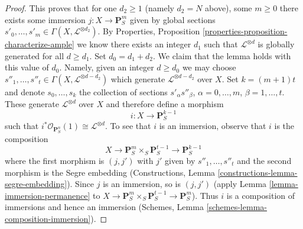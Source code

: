 \documentclass[10pt,a4paper]{amsart}
\theoremstyle{plain}
\theoremstyle{definition}
\theoremstyle{remark}
\numberwithin{equation}{subsection}
\begin{document}
\begin{proof}
\medskip\noindent
This proves that for one $d_2 \geq 1$
(namely $d_2 = N$ above), some $m \geq 0$ there exists some
immersion $j : X \to \mathbf{P}^m_S$ given by global sections
$s'_0, \ldots, s'_m \in \Gamma(X, \mathcal{L}^{\otimes d_2})$.
By Properties, Proposition \ref{properties-proposition-characterize-ample}
we know there exists an integer
$d_1$ such that $\mathcal{L}^{\otimes d}$ is globally generated
for all $d \geq d_1$. Set $d_0 = d_1 + d_2$. We claim that
the lemma holds with this value of $d_0$. Namely, given
an integer $d \geq d_0$ we may choose $s''_1, \ldots, s''_t
\in \Gamma(X, \mathcal{L}^{\otimes d - d_2})$ which generate
$\mathcal{L}^{\otimes d - d_2}$ over $X$. Set $k = (m + 1)t$ and
denote $s_0, \ldots, s_k$ the collection of sections
$s'_\alpha s''_\beta$, $\alpha = 0, \ldots, m$,
$\beta = 1, \ldots, t$. These generate $\mathcal{L}^{\otimes d}$
over $X$ and therefore define a morphism
$$
i : X \longrightarrow \mathbf{P}^{k - 1}_S
$$
such that $i^*\mathcal{O}_{\mathbf{P}^n_S}(1) \cong \mathcal{L}^{\otimes d}$.
To see that $i$ is an immersion, observe that $i$ is the composition
$$
X \longrightarrow \mathbf{P}^m_S \times_S \mathbf{P}^{t - 1}_S
\longrightarrow \mathbf{P}^{k - 1}_S
$$
where the first morphism is $(j, j')$ with $j'$ given by
$s''_1, \ldots, s''_t$ and the
second morphism is the Segre embedding
(Constructions, Lemma \ref{constructions-lemma-segre-embedding}).
Since $j$ is an immersion, so is $(j, j')$
(apply Lemma \ref{lemma-immersion-permanence}
to $X \to \mathbf{P}^m_S \times_S \mathbf{P}^{t - 1}_S
\to \mathbf{P}^m_S$). Thus $i$ is a composition of
immersions and hence an immersion
(Schemes, Lemma \ref{schemes-lemma-composition-immersion}).
\end{proof}
\end{document}
